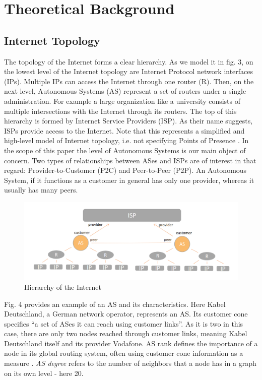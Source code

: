 \documentclass[conference, 11pt]{IEEEtran}
\begin{document}
\section{Theoretical Background} 
\subsection{Internet Topology}

The topology of the Internet forms a clear hierarchy. As we model it in fig. 3, on the lowest level of the Internet topology are Internet Protocol network interfaces (IPs). Multiple IPs can access the Internet through one router (R). Then, on the next level, Autonomous Systems (AS) represent a set of routers under a single administration. For example a large organization like a university consists of multiple intersections with the Internet through its routers. The top of this hierarchy is formed by Internet Service Providers (ISP). As their name suggests, ISPs provide access to the Internet. Note that this represents a simplified and high-level model of Internet topology, i.e. not specifying Points of Presence \cite{ASH}. In the scope of this paper the level of Autonomous Systems is our main object of concern. Two types of relationships between ASes and ISPs are of interest in that regard: Provider-to-Customer (P2C) and Peer-to-Peer (P2P). An Autonomous System, if it functions as a customer in general has only one provider, whereas it usually has many peers. 
 

\begin{figure}[htbp]
\centerline{\includegraphics[scale=0.26]{Graphics/hierarchy.PNG}}
\caption{Hierarchy of the Internet}
\label{fig}
\end{figure}
\vspace{0.5cm}





Fig. 4 provides an example of an AS and its characteristics. Here Kabel Deutschland, a German network operator, represents an AS. Its customer cone specifies  ``a set of ASes it can reach using customer links''\cite{Rank}. As it is two in this case, there are only two nodes reached through customer links, meaning Kabel Deutschland itself and its provider Vodafone\cite{Rank}.  
AS rank defines the importance of a node in its global routing system, often using customer cone information as a measure \cite{Rank}.
\textit{AS degree} refers to the number of neighbors that a node has in a graph on its own level - here 20\cite{Cone}.  \\
\end{document}
